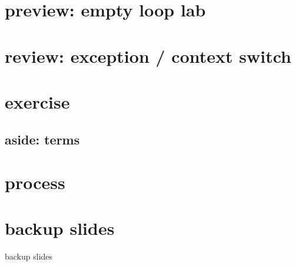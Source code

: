 \section{preview: empty loop lab}


\section{review: exception / context switch}


\section{exercise}


\subsection{aside: terms}


\section{process}




\section{backup slides}
\begin{frame}{backup slides}
\end{frame}


